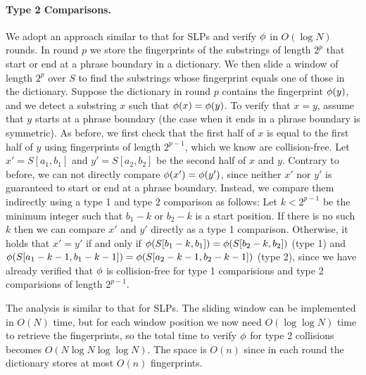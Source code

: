\paragraph{Type 2 Comparisons.}
We adopt an approach similar to that for SLPs and verify $\phi$ in $O(\log N)$ rounds. In round $p$ we store the fingerprints of the substrings of length $2^p$ that start or end at a phrase boundary in a dictionary. We then slide a window of length $2^p$ over $S$ to find the substrings whose fingerprint equals one of those in the dictionary. Suppose the dictionary in round $p$ contains the fingerprint $\phi(y)$, and we detect a substring $x$ such that $\phi(x)=\phi(y)$. To verify that $x=y$, assume that $y$ starts at a phrase boundary (the case when it ends in a phrase boundary is symmetric). As before, we first check that the first half of $x$ is equal to the first half of $y$ using fingerprints of length $2^{p-1}$, which we know are collision-free. Let $x'=S[a_1,b_1]$ and $y'=S[a_2,b_2]$ be the second half of $x$ and $y$. Contrary to before, we can not directly compare $\phi(x')=\phi(y')$, since neither $x'$ nor $y'$ is guaranteed to start or end at a phrase boundary. Instead, we compare them indirectly using a type 1 and type 2 comparison as follows: Let $k < 2^{p-1}$ be the minimum integer such that $b_1-k$ or $b_2-k$ is a start position. If there is no such $k$ then we can compare $x'$ and $y'$ directly as a type 1 comparison. Otherwise, it holds that $x' = y'$ if and only if $\phi(S[b_1-k,b_1]) = \phi(S[b_2-k,b_2])$ (type 1) and $\phi(S[a_1-k-1,b_1-k-1]) = \phi(S[a_2-k-1,b_2-k-1])$ (type 2), since we have already verified that $\phi$ is collision-free for type 1 comparisions and type 2 comparisions of length $2^{p-1}$.

The analysis is similar to that for SLPs. The sliding window can be implemented in $O(N)$ time, but for each window position we now need $O(\log\log N)$ time to retrieve the fingerprints, so the total time to verify $\phi$ for type 2 collisions becomes $O(N \log N \log\log N)$. The space is $O(n)$ since in each round the dictionary stores at most $O(n)$ fingerprints.




%

%
%

%
